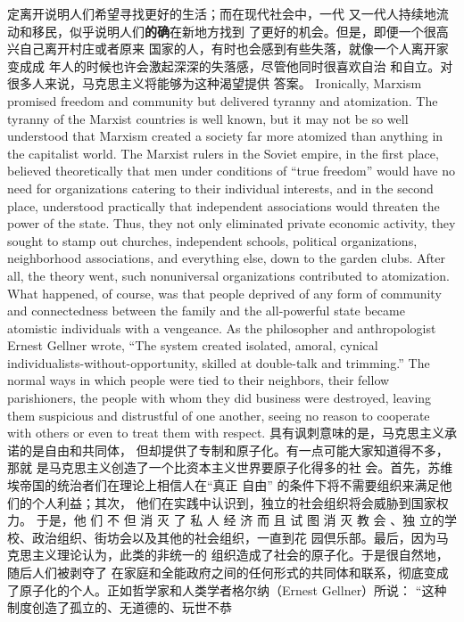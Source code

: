\begin{paracol}{2}
定离开说明人们希望寻找更好的生活；而在现代社会中，一代
又一代人持续地流动和移民，似乎说明人们\textbf{的确}在新地方找到
了更好的机会。但是，即便一个很高兴自己离开村庄或者原来
国家的人，有时也会感到有些失落，就像一个人离开家变成成
年人的时候也许会激起深深的失落感，尽管他同时很喜欢自治
和自立。对很多人来说，马克思主义将能够为这种渴望提供
答案。
\switchcolumn*
Ironically, Marxism promised freedom and community but
delivered tyranny and atomization. The tyranny of the Marxist
countries is well known, but it may not be so well understood
that Marxism created a society far more atomized than anything in the capitalist world. The Marxist rulers in the Soviet
empire, in the first place, believed theoretically that men under
conditions of ``true freedom'' would have no need for organizations catering to their individual interests, and in the second
place, understood practically that independent associations
would threaten the power of the state. Thus, they not only
eliminated private economic activity, they sought to stamp out
churches, independent schools, political organizations, neighborhood associations, and everything else, down to the garden
clubs. After all, the theory went, such nonuniversal organizations contributed to atomization. What happened, of course,
was that people deprived of any form of community and connectedness between the family and the all-powerful state became atomistic individuals with a vengeance. As the
philosopher and anthropologist Ernest Gellner wrote, ``The system created isolated, amoral, cynical individualists-without-opportunity, skilled at double-talk and trimming.'' The normal
ways in which people were tied to their neighbors, their fellow
parishioners, the people with whom they did business were destroyed, leaving them suspicious and distrustful of one another,
seeing no reason to cooperate with others or even to treat them
with respect.
\switchcolumn
具有讽刺意味的是，马克思主义承诺的是自由和共同体，
但却提供了专制和原子化。有一点可能大家知道得不多，那就
是马克思主义创造了一个比资本主义世界要原子化得多的社
会。首先，苏维埃帝国的统治者们在理论上相信人在“真正
自由” 的条件下将不需要组织来满足他们的个人利益；其次，
他们在实践中认识到，独立的社会组织将会威胁到国家权力。
于是，他 们 不 但 消 灭 了 私 人 经 济 而 且 试 图 消 灭 教 会 、独
立的学校、政治组织、街坊会以及其他的社会组织，一直到花
园倶乐部。最后，因为马克思主义理论认为，此类的非统一的
组织造成了社会的原子化。于是很自然地，随后人们被剥夺了
在家庭和全能政府之间的任何形式的共同体和联系，彻底变成
了原子化的个人。正如哲学家和人类学者格尔纳（Ernest Gellner）所说： “这种制度创造了孤立的、无道德的、玩世不恭

\end{paracol}
